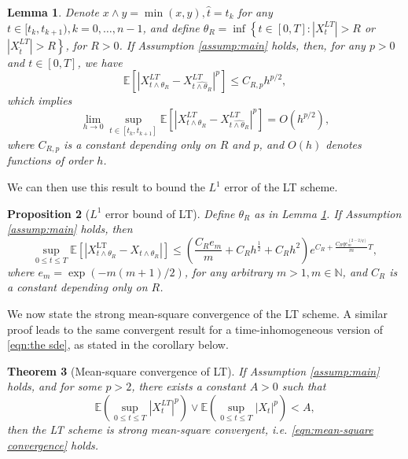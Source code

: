 \documentclass[a4paper,12pt]{article}
\numberwithin{equation}{section}
\theoremstyle{plain}
\newtheorem{theorem}{Theorem}[section]
\newtheorem{lemma}[theorem]{Lemma}
\newtheorem{proposition}[theorem]{Proposition}
\theoremstyle{definition}
\begin{document}
\begin{lemma}\label{lemma:LT_onestep_stop}
     Denote $x\wedge y=\min(x,y),  \hat{t}=t_k$ for any $ t\in [t_k,t_{k+1}), k=0,\ldots, n-1$, and define $\theta_R=\inf \left\{t \in[0, T]:\left|X^{LT}_t\right|>R\right.$ or $\left.\left|X^{LT}_{\hat{t}}\right|>R\right\}$, for $R>0$. If Assumption \ref{assump:main} holds, then, for any $p>0$ and $t\in [0,T]$, we have
    \begin{equation}\label{eqn:LT onestep bound}
\mathbb{E}\left[\left|X^{LT}_{t \wedge \theta_R}-X^{LT}_{\widehat{t \wedge \theta_R}}\right|^p\right] \leq C_{R,p} h^{p / 2},
 \end{equation}
which  implies 
\begin{equation}\label{eqn:LT onestep convergence rate}
    \lim_{h\rightarrow 0}\sup _{t \in\left[t_{k}, t_{k+1}\right]} \mathbb{E}\left[\left|X^{LT}_{t \wedge \theta_R}-X^{LT}_{\widehat{t \wedge \theta_R}}\right|^p\right]=O\left(h^{p / 2}\right), 
\end{equation}
where $C_{R,p}$ is a constant depending only on $R$ and $p$, and $O(h)$ denotes functions of order $h$.
\end{lemma}
\noindent We can then use this result to bound the $L^1$ error of the LT scheme.
\begin{proposition}[$L^1$ error bound of LT]\label{prop:LT L1}
Define $\theta_R$ as in Lemma \ref{lemma:LT_onestep_stop}. 
If Assumption \ref{assump:main} holds, then
    \begin{equation}\label{eqn:L1 bound}
        \sup_{0\leq t\leq T}\mathbb{E}\left[\left|X^{\textrm{LT}}_{t\wedge \theta_R}-X_{t\wedge \theta_R}\right|\right]\leq \left(\frac{C_Re_m}{m}+C_Rh^{\frac{1}{2}}+C_Rh^{2}\right)e^{C_R+\frac{C_Rqe_m^{(2-2/q)}}{m}T},
    \end{equation}
    where $e_m=\exp(-m(m+1)/2)$, for any arbitrary $m>1,m\in \mathbb{N}$, and
    $C_R$ is a constant depending only on $R$. 
\end{proposition}
We now state the strong mean-square convergence of the LT scheme. A similar proof leads to the same convergent result for a time-inhomogeneous version of \eqref{eqn:the sde}, as stated in the corollary below.
\begin{theorem}[Mean-square convergence of LT]\label{thrm:LT convergence}
If Assumption \ref{assump:main} holds, and for some $p>2$, there exists a constant $A>0$ such that \begin{equation}\label{assump:LT_moment_bound}
         \mathbb{E}\left(\sup _{0 \leq t \leq T}\left|X^{LT}_t\right|^p\right) \vee \mathbb{E}\left(\sup _{0 \leq t \leq T}\left|X_t\right|^p\right)<A,
     \end{equation}
     then the LT scheme is strong mean-square convergent, i.e. \eqref{eqn:mean-square convergence} holds.
\end{theorem}
\end{document}
